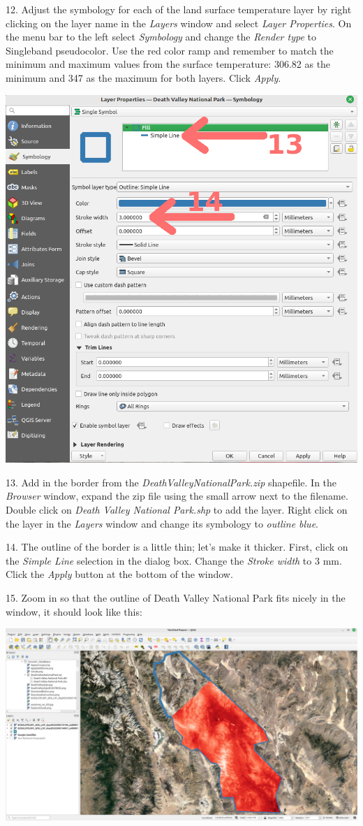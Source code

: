 \documentclass[oneside,a4paper,11pt,explicit]{book}
\begin{document}
12. Adjust the symbology for each of the land surface temperature layer by right clicking on the layer name in the \textit{Layers} window and select \textit{Layer Properties}. On the menu bar to the left select \textit{Symbology} and change the \textit{Render type} to Singleband pseudocolor. Use the red color ramp and remember to match the minimum and maximum values from the surface temperature: 306.82 as the minimum and 347 as the maximum for both layers. Click \textit{Apply}.

\centerline{\includegraphics[width=.625\textwidth]{DVlines.png}}

13. Add in the border from the \textit{DeathValleyNationalPark.zip} shapefile. In the \textit{Browser} window, expand the zip file using the small arrow next to the filename. Double click on \textit{Death Valley National Park.shp} to add the layer. Right click on the layer in the \textit{Layers} window and change its symbology to \textit{outline blue}. 

14. The outline of the border is a little thin; let's make it thicker. First, click on the \textit{Simple Line} selection in the dialog box. Change the \textit{Stroke width} to 3 mm. Click the \textit{Apply} button at the bottom of the window.

15. Zoom in so that the outline of Death Valley National Park fits nicely in the window, it should look like this:

\vspace{.25em}

\centerline{\includegraphics[width=\textwidth]{DV_LST.png}}
\end{document}
